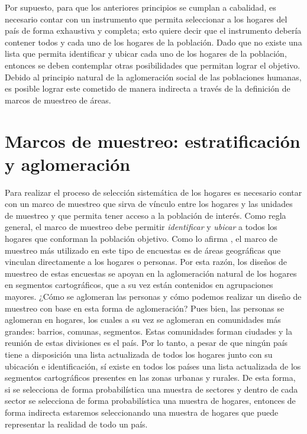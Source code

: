 Por supuesto, para que los anteriores principios se cumplan a cabalidad, es necesario contar con un instrumento que permita seleccionar a los hogares del país de forma exhaustiva y completa; esto quiere decir que el instrumento debería contener todos y cada uno de los hogares de la población. Dado que no existe una lista que permita identificar y ubicar cada uno de los hogares de la población, entonces se deben contemplar otras posibilidades que permitan lograr el objetivo. Debido al principio natural de la aglomeración social de las poblaciones humanas, es posible lograr este cometido de manera indirecta a través de la definición de marcos de muestreo de áreas.

\hypertarget{marcos-de-muestreo-estratificacion-y-aglomeracion}{%
\section{Marcos de muestreo: estratificación y aglomeración}\label{marcos-de-muestreo-estratificacion-y-aglomeracion}}

Para realizar el proceso de selección sistemática de los hogares es necesario contar con un marco de muestreo que sirva de vínculo entre los hogares y las unidades de muestreo y que permita tener acceso a la población de interés. Como regla general, el marco de muestreo debe permitir \emph{identificar} y \emph{ubicar} a todos los hogares que conforman la población objetivo. Como lo afirma \citet{Gutierrez_2016}, el marco de muestreo más utilizado en este tipo de encuestas es de áreas geográficas que vinculan directamente a los hogares o personas. Por esta razón, los diseños de muestreo de estas encuestas se apoyan en la aglomeración natural de los hogares en segmentos cartográficos, que a su vez están contenidos en agrupaciones mayores. ¿Cómo se aglomeran las personas y cómo podemos realizar un diseño de muestreo con base en esta forma de aglomeración? Pues bien, las personas se aglomeran en hogares, los cuales a su vez se aglomeran en comunidades más grandes: barrios, comunas, segmentos. Estas comunidades forman ciudades y la reunión de estas divisiones es el país. Por lo tanto, a pesar de que ningún país tiene a disposición una lista actualizada de todos los hogares junto con su ubicación e identificación, sí existe en todos los países una lista actualizada de los segmentos cartográficos presentes en las zonas urbanas y rurales. De esta forma, si se selecciona de forma probabilística una muestra de sectores y dentro de cada sector se selecciona de forma probabilística una muestra de hogares, entonces de forma indirecta estaremos seleccionando una muestra de hogares que puede representar la realidad de todo un país.


